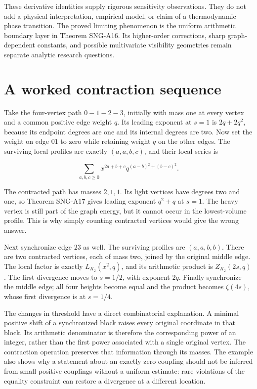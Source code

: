 \documentclass[
  11pt,
  a4paper,
]{report}
\begin{document}
These derivative identities supply rigorous sensitivity observations.
They do not add a physical interpretation, empirical model, or claim of
a thermodynamic phase transition. The proved limiting phenomenon is the
uniform arithmetic boundary layer in Theorem SNG-A16. Its higher-order
corrections, sharp graph-dependent constants, and possible multivariate
visibility geometries remain separate analytic research questions.

\hypertarget{a-worked-contraction-sequence}{%
\section{A worked contraction
sequence}\label{a-worked-contraction-sequence}}

Take the four-vertex path \(0-1-2-3\), initially with mass one at every
vertex and a common positive edge weight \(q\). Its leading exponent at
\(s=1\) is \(2q+2q^2\), because its endpoint degrees are one and its
internal degrees are two. Now set the weight on edge \(01\) to zero
while retaining weight \(q\) on the other edges. The surviving local
profiles are exactly \((a,a,b,c)\), and their local series is

\[
 \sum_{a,b,c\ge0}x^{2a+b+c}
 q^{(a-b)^2+(b-c)^2}.
 \tag{8.7}
\]

The contracted path has masses \(2,1,1\). Its light vertices have
degrees two and one, so Theorem SNG-A17 gives leading exponent \(q^2+q\)
at \(s=1\). The heavy vertex is still part of the graph energy, but it
cannot occur in the lowest-volume profile. This is why simply counting
contracted vertices would give the wrong answer.

Next synchronize edge \(23\) as well. The surviving profiles are
\((a,a,b,b)\). There are two contracted vertices, each of mass two,
joined by the original middle edge. The local factor is exactly
\(L_{K_2}(x^2,q)\), and its arithmetic product is \(Z_{K_2}(2s,q)\). The
first divergence moves to \(s=1/2\), with exponent \(2q\). Finally
synchronize the middle edge; all four heights become equal and the
product becomes \(\zeta(4s)\), whose first divergence is at \(s=1/4\).

The changes in threshold have a direct combinatorial explanation. A
minimal positive shift of a synchronized block raises every original
coordinate in that block. Its arithmetic denominator is therefore the
corresponding power of an integer, rather than the first power
associated with a single original vertex. The contraction operation
preserves that information through its masses. The example also shows
why a statement about an exactly zero coupling should not be inferred
from small positive couplings without a uniform estimate: rare
violations of the equality constraint can restore a divergence at a
different location.
\end{document}
